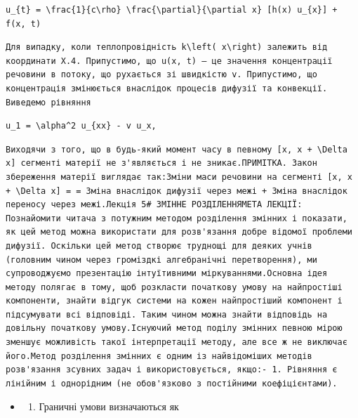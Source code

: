\documentclass[
  ukrainian,
]{article}
\providecommand{\tightlist}{%
  \setlength{\itemsep}{0pt}\setlength{\parskip}{0pt}}
\begin{document}
\begin{verbatim}
u_{t} = \frac{1}{c\rho} \frac{\partial}{\partial x} [h(x) u_{x}] + f(x, t)
\end{verbatim}

\begin{verbatim}
Для випадку, коли теплопровідність k\left( x\right) залежить від координати X.4. Припустимо, що u(x, t) — це значення концентрації речовини в потоку, що рухається зі швидкістю v. Припустимо, що концентрація змінюється внаслідок процесів дифузії та конвекції. Виведемо рівняння
\end{verbatim}

\begin{verbatim}
u_1 = \alpha^2 u_{xx} - v u_x,
\end{verbatim}

\begin{verbatim}
Виходячи з того, що в будь-який момент часу в певному [x, x + \Delta x] сегменті матерії не з'являється і не зникає.ПРИМІТКА. Закон збереження матерії виглядає так:Зміни маси речовини на сегменті [x, x + \Delta x] = = Зміна внаслідок дифузії через межі + Зміна внаслідок переносу через межі.Лекція 5# ЗМІННЕ РОЗДІЛЕННЯМЕТА ЛЕКЦІЇ: Познайомити читача з потужним методом розділення змінних і показати, як цей метод можна використати для розв'язання добре відомої проблеми дифузії. Оскільки цей метод створює труднощі для деяких учнів (головним чином через громіздкі алгебранічні перетворення), ми супроводжуємо презентацію інтуїтивними міркуваннями.Основна ідея методу полягає в тому, щоб розкласти початкову умову на найпростіші компоненти, знайти відгук системи на кожен найпростіший компонент і підсумувати всі відповіді. Таким чином можна знайти відповідь на довільну початкову умову.Існуючий метод поділу змінних певною мірою зменшує можливість такої інтерпретації методу, але все ж не виключає його.Метод розділення змінних є одним із найвідоміших методів розв'язання зсувних задач і використовується, якщо:- 1. Рівняння є лінійним і однорідним (не обов'язково з постійними коефіцієнтами).
\end{verbatim}

\begin{itemize}
\tightlist
\item
  \begin{enumerate}
  \def\labelenumi{\arabic{enumi}.}
  \setcounter{enumi}{1}
  \tightlist
  \item
    Граничні умови визначаються як
  \end{enumerate}
\end{itemize}
\end{document}
